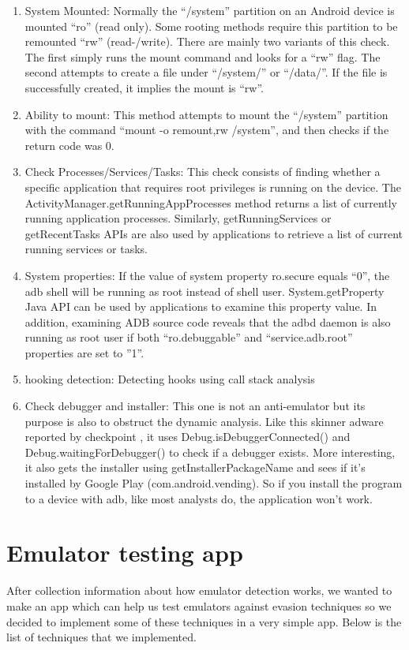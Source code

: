 \documentclass[../main.tex]{subfile}
\begin{document}
\begin{enumerate}
	\item System Mounted: Normally the “/system” partition on an Android device is mounted “ro” (read only). Some rooting methods require this partition to be remounted “rw” (read-/write). There are mainly two variants of this check. The first simply runs the mount command and looks for a “rw” flag. The second attempts to create a file under “/system/” or “/data/”. If the file is successfully created, it implies the mount is “rw”.
	\item Ability to mount: This method attempts to mount the “/system” partition with the command “mount -o remount,rw /system”, and then checks if the return code was 0.
	\item Check Processes/Services/Tasks: This check consists of finding whether a specific application that requires root privileges is running on the device. The ActivityManager.getRunningAppProcesses method returns a list of currently running application processes. Similarly, getRunningServices or getRecentTasks APIs are also used by applications to retrieve a list of current running services or tasks.
	\item System properties: If the value of system property ro.secure equals “0”, the adb shell will be running as root instead of shell user. System.getProperty Java API can be used by applications to examine this property value. In addition, examining ADB source code reveals that the adbd daemon is also running as root user if both “ro.debuggable” and “service.adb.root” properties are set to ”1”.\cite{sophos_anti_emulation} \cite{vidas2014evading}
	\item hooking detection: Detecting hooks using call stack analysis \cite{lim2016android}
	\item Check debugger and installer: This one is not an anti-emulator but its purpose is also to obstruct the dynamic analysis. Like this skinner adware reported by checkpoint \cite{skinner_adware}, it uses Debug.isDebuggerConnected() and Debug.waitingForDebugger() to check if a debugger exists. More interesting, it also gets the installer using getInstallerPackageName and sees if it’s installed by Google Play (com.android.vending). So if you install the program to a device with adb, like most analysts do, the application won’t work.\cite{sophos_anti_emulation}
	
	
	\end{enumerate}
	\section{Emulator testing app}\label{sec::emulator_testor}
	After collection information about how emulator detection works, we wanted to make an app which can help us test emulators against evasion techniques so we decided to implement some of these techniques in a very simple app. Below is the list of techniques that we implemented. 
	
\end{document}
